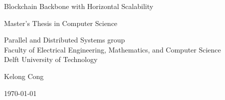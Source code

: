 \begin{titlepage}

  \begin{center}
  \null\vfill
    \begin{center}
    \LARGE{Blockchain Backbone with Horizontal Scalability}
    \end{center}

    \vspace{3cm}

    \begin{large}
    Master's Thesis in Computer Science
    \end{large}

    \vspace{1.5cm}

    \begin{normalsize}
    Parallel and Distributed Systems group\\
    Faculty of Electrical Engineering, Mathematics, and Computer Science\\
    Delft University of Technology
    \end{normalsize}

    \vspace{2.0cm}

    \begin{normalsize}
    Kelong Cong
    \end{normalsize}

    \vspace{1.0cm}

    \today            %

  \vfill
  \end{center}

\end{titlepage}

